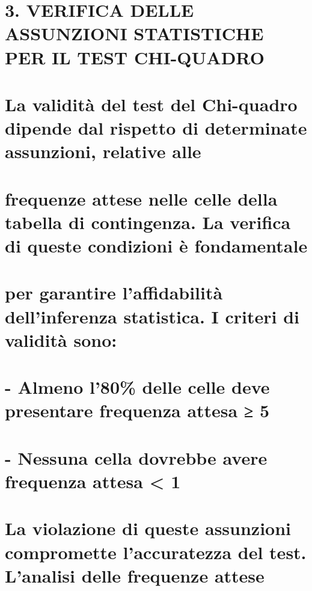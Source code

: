 \documentclass[
]{article}
\begin{document}
\section{3. VERIFICA DELLE ASSUNZIONI STATISTICHE PER IL TEST
CHI-QUADRO}\label{verifica-delle-assunzioni-statistiche-per-il-test-chi-quadro}

\section{La validità del test del Chi-quadro dipende dal rispetto di
determinate assunzioni, relative
alle}\label{la-validituxe0-del-test-del-chi-quadro-dipende-dal-rispetto-di-determinate-assunzioni-relative-alle}

\section{frequenze attese nelle celle della tabella di contingenza. La
verifica di queste condizioni è
fondamentale}\label{frequenze-attese-nelle-celle-della-tabella-di-contingenza.-la-verifica-di-queste-condizioni-uxe8-fondamentale}

\section{per garantire l'affidabilità dell'inferenza statistica. I
criteri di validità
sono:}\label{per-garantire-laffidabilituxe0-dellinferenza-statistica.-i-criteri-di-validituxe0-sono}

\section{- Almeno l'80\% delle celle deve presentare frequenza attesa ≥
5}\label{almeno-l80-delle-celle-deve-presentare-frequenza-attesa-5}

\section{- Nessuna cella dovrebbe avere frequenza attesa \textless{}
1}\label{nessuna-cella-dovrebbe-avere-frequenza-attesa-1}

\section{La violazione di queste assunzioni compromette l'accuratezza
del test. L'analisi delle frequenze
attese}\label{la-violazione-di-queste-assunzioni-compromette-laccuratezza-del-test.-lanalisi-delle-frequenze-attese}
\end{document}
